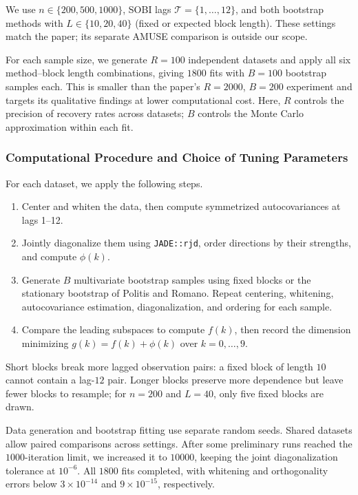 \documentclass[
  english,
  11pt,
  a4paper,
]{article}
\providecommand{\tightlist}{%
  \setlength{\itemsep}{0pt}\setlength{\parskip}{0pt}}
\begin{document}
We use \(n\in\{200,500,1000\}\), SOBI lags
\(\mathcal T=\{1,\ldots,12\}\), and both bootstrap methods with
\(L\in\{10,20,40\}\) (fixed or expected block length). These settings
match the paper; its separate AMUSE comparison is outside our scope.

For each sample size, we generate \(R=100\) independent datasets and
apply all six method--block length combinations, giving \(1800\) fits
with \(B=100\) bootstrap samples each. This is smaller than the paper's
\(R=2000\), \(B=200\) experiment and targets its qualitative findings at
lower computational cost. Here, \(R\) controls the precision of recovery
rates across datasets; \(B\) controls the Monte Carlo approximation
within each fit.

\subsubsection{Computational Procedure and Choice of Tuning
Parameters}\label{computational-procedure-and-choice-of-tuning-parameters}

For each dataset, we apply the following steps.

\begin{enumerate}
\def\labelenumi{\arabic{enumi}.}
\tightlist
\item
  Center and whiten the data, then compute symmetrized autocovariances
  at lags 1--12.
\item
  Jointly diagonalize them using \texttt{JADE::rjd}, order directions by
  their strengths, and compute \(\phi(k)\).
\item
  Generate \(B\) multivariate bootstrap samples using fixed blocks or
  the stationary bootstrap of Politis and Romano. Repeat centering,
  whitening, autocovariance estimation, diagonalization, and ordering
  for each sample.
\item
  Compare the leading subspaces to compute \(f(k)\), then record the
  dimension minimizing \(g(k)=f(k)+\phi(k)\) over \(k=0,\ldots,9\).
\end{enumerate}

Short blocks break more lagged observation pairs: a fixed block of
length \(10\) cannot contain a lag-\(12\) pair. Longer blocks preserve
more dependence but leave fewer blocks to resample; for \(n=200\) and
\(L=40\), only five fixed blocks are drawn.

Data generation and bootstrap fitting use separate random seeds. Shared
datasets allow paired comparisons across settings. After some
preliminary runs reached the \(1000\)-iteration limit, we increased it
to \(10000\), keeping the joint diagonalization tolerance at
\(10^{-6}\). All \(1800\) fits completed, with whitening and
orthogonality errors below \(3\times10^{-14}\) and \(9\times10^{-15}\),
respectively.
\end{document}
